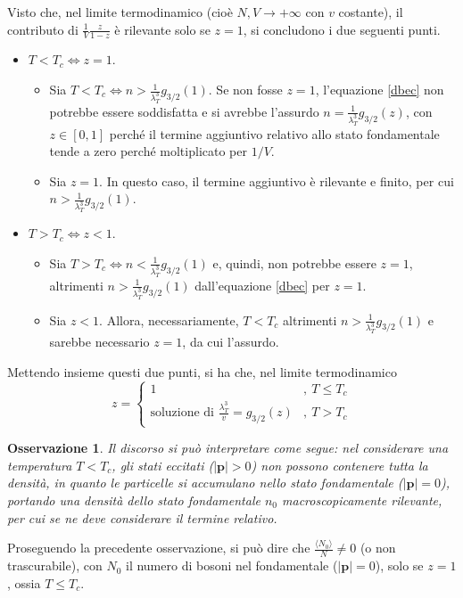 \documentclass[11pt, a4paper]{scrartcl}
\theoremstyle{style}
\newtheorem{osservazione}{Osservazione}[section]
\theoremstyle{style1}
\numberwithin{equation}{subsection}
\begin{document}
Visto che, nel limite termodinamico (cio\`e $N,V \to +\infty$ con $v$ costante), il contributo di $\frac{1}{V} \frac{z}{1-z}$ \`e rilevante solo se $z=1$, si concludono i due seguenti punti.
\begin{itemize}
	\item $T<T_c \iff z=1$.
	\begin{itemize}
		\item[$(\Rightarrow )$] Sia $T<T_c\iff n>\frac{1}{\lambda _T^3}g_{3 / 2} (1)$.
			Se non fosse $z=1$, l'equazione \ref{dbec} non potrebbe essere soddisfatta e si avrebbe l'assurdo $n = \frac{1}{\lambda _T^3}g_{3 / 2} (z)$, con $z \in \left[ 0,1 \right] $ perch\'e il termine aggiuntivo relativo allo stato fondamentale tende a zero perch\'e moltiplicato per $1 / V$.
		\item[$(\Leftarrow)$] Sia $z = 1$. 
			In questo caso, il termine aggiuntivo \`e rilevante e finito, per cui $n > \frac{1}{\lambda _T^3}g_{3 / 2} (1)$.
	\end{itemize}
	\item $T>T_c \iff z<1$.
	\begin{itemize}
		\item[$(\Rightarrow )$] Sia $T>T_c \iff n< \frac{1}{\lambda _T^3}g_{3 / 2} (1) $ e, quindi, non potrebbe essere $z=1$, altrimenti $n>\frac{1}{\lambda _T^3}g_{3 / 2} (1)$ dall'equazione \ref{dbec} per $z=1$.
		\item[$(\Leftarrow)$] Sia $z<1$.
			Allora, necessariamente, $T<T_c$ altrimenti $n > \frac{1}{\lambda _T^3}g_{3 / 2} (1)$ e sarebbe necessario $z=1$, da cui l'assurdo.
	\end{itemize}
\end{itemize}
Mettendo insieme questi due punti, si ha che, nel limite termodinamico
\[
z = \begin{cases}
	1 &,\ T\le T_c\\
	\text{soluzione di } \frac{\lambda _T^3}{v}=g_{3 / 2} (z) &,\ T>T_c
\end{cases}
\] 
\begin{osservazione}
Il discorso si pu\`o interpretare come segue: nel considerare una temperatura $T<T_c$, gli stati eccitati ($\lvert \mathbf{p} \rvert  >0$) non possono contenere tutta la densit\`a, in quanto le particelle si accumulano nello stato fondamentale ($\lvert \mathbf{p}  \rvert =0$), portando una densit\`a dello stato fondamentale $n_0$ macroscopicamente rilevante, per cui se ne deve considerare il termine relativo.
\end{osservazione}
\noindent Proseguendo la precedente osservazione, si pu\`o dire che $\frac{\langle N_0 \rangle}{N}\neq 0$ (o non trascurabile), con $N_0$ il numero di bosoni nel fondamentale ($\lvert \mathbf{p}  \rvert =0$), solo se $z=1$, ossia $T\le T_c$.
\end{document}
